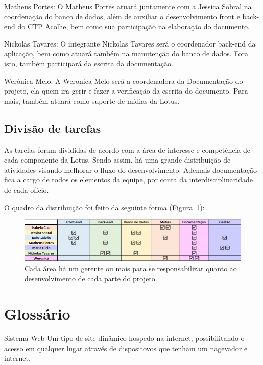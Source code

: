 \documentclass[12pt,a4paper]{article}
\begin{document}
Matheus Portes: O Matheus Portes atuará juntamente com a Jessíca Sobral na coordenação do banco de dados, além de auxiliar o desenvolvimento front e back-end do CTP Acolhe, bem como sua participação na elaboração do documento. 

Nickolas Tavares: O integrante Nickolas Tavares será o coordenador  back-end da aplicação, bem como atuará também na manutenção do banco de dados. Fora isto, também participará da escrita da documentação.

Werônica Melo: A Weronica Melo será a coordenadora da Documentação do projeto, ela quem ira gerir e fazer a verificação da escrita do documento. Para mais, também atuará como suporte de mídias da Lotus.

\subsection{Divisão de tarefas}
As tarefas foram divididas de acordo com a área de interesse e competência de cada componente da Lotus. Sendo assim, há uma grande distribuição de atividades visando melhorar o fluxo do desenvolvimento. Ademais  documentação fica a cargo de todos os elementos da equipe, por conta da interdisciplinaridade de cada ofício.

 O quadro da distribuição foi feito da seguinte forma (Figura~\ref{fig05}):
\begin{figure}[H]
    \centering
     \includegraphics[width=15cm]{img5.png}
    \caption{Cada área há um gerente ou mais para se responsabilizar quanto ao desenvolvimento de cada parte do projeto.}
    \label{fig05}
\end{figure}

\newpage


%


\newpage
\section{Glossário}
\indent
        Sistema Web 
        Um tipo de site dinâmico hospedo na internet, possibilitando o acesso em qualquer lugar através de dispositovos que tenham um nagevador e internet.
    
\end{document}
